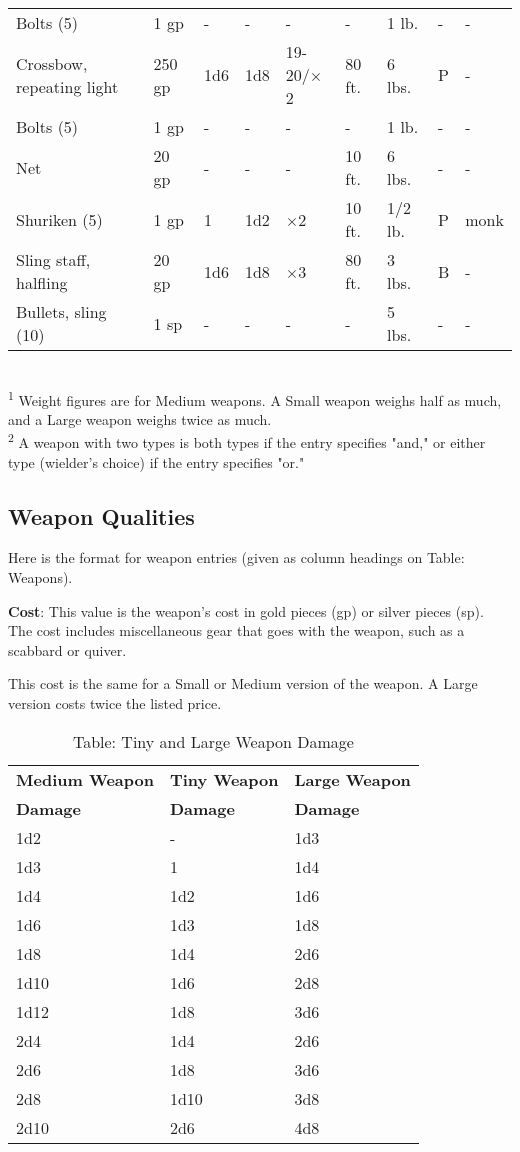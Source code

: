 \begin{table*}
\begin{tabular}{lllllllll}
 Bolts (5) & 1 gp & - & - & - & - & 1 lb. & - & - \\
 Crossbow, repeating light & 250 gp & 1d6 & 1d8 & 19-20/$\times$2 & 80 ft. & 6 lbs. & P & - \\
 Bolts (5) & 1 gp & - & - & - & - & 1 lb. & - & - \\
 Net & 20 gp & - & - & - & 10 ft. & 6 lbs. & - & - \\
 Shuriken (5) & 1 gp & 1 & 1d2 & $\times$2 & 10 ft. & 1/2 lb. & P & monk \\
 Sling staff, halfling & 20 gp & 1d6 & 1d8 & $\times$3 & 80 ft. & 3 lbs. & B & - \\
 Bullets, sling (10) & 1 sp & - & - & - & - & 5 lbs. & - & -\\
\end{tabular}\\
\textsuperscript{1} Weight figures are for Medium weapons. A Small weapon weighs half as much, and a Large weapon weighs twice as much.\\
\textsuperscript{2} A weapon with two types is both types if the entry specifies "and," or either type (wielder's choice) if the entry specifies "or."\\
\end{table*}


\subsection{Weapon Qualities}

Here is the format for weapon entries (given as column headings on Table: Weapons).
		
\textbf{Cost}: This value is the weapon's cost in gold pieces (gp) or silver pieces (sp). The cost includes miscellaneous gear that goes with the weapon, such as a scabbard or quiver.
		
This cost is the same for a Small or Medium version of the weapon. A Large version costs twice the listed price.
		

\begin{table}[]
\sffamily
\caption{Table: Tiny and Large Weapon Damage}
\begin{tabular}{lll}
\textbf{Medium Weapon} & \textbf{Tiny Weapon} & \textbf{Large Weapon} \\
\textbf{Damage} & \textbf{Damage} & \textbf{Damage}\\
1d2& -& 1d3 \\
1d3& 1& 1d4 \\
1d4& 1d2& 1d6 \\
1d6& 1d3& 1d8 \\
1d8& 1d4& 2d6 \\
1d10& 1d6& 2d8 \\
1d12& 1d8& 3d6 \\
2d4& 1d4& 2d6 \\
2d6& 1d8& 3d6 \\
2d8& 1d10& 3d8 \\
2d10& 2d6& 4d8\\
\end{tabular}
\end{table}
		
